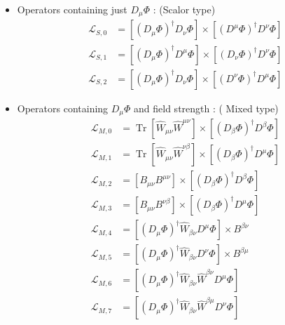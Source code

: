 \begin{itemize}
\item Operators containing just $D_\mu \Phi$ : (Scalor type)
\begin{equation}
\begin{aligned}
\mathcal{L}_{S, 0} &=\left[\left(D_{\mu} \Phi\right)^{\dagger} D_{\nu} \Phi\right] \times\left[\left(D^{\mu} \Phi\right)^{\dagger} D^{\nu} \Phi\right] \\
\mathcal{L}_{S, 1} &=\left[\left(D_{\mu} \Phi\right)^{\dagger} D^{\mu} \Phi\right] \times\left[\left(D_{\nu} \Phi\right)^{\dagger} D^{\nu} \Phi\right] \\
\mathcal{L}_{S, 2} &=\left[\left(D_{\mu} \Phi\right)^{\dagger} D_{\nu} \Phi\right] \times\left[\left(D^{\nu} \Phi\right)^{\dagger} D^{\mu} \Phi\right]
\end{aligned}
\end{equation}
\item Operators containing $D_\mu \Phi$ and field strength : ( Mixed type)
\begin{equation}
\begin{aligned}
\mathcal{L}_{M, 0} &=\operatorname{Tr}\left[\hat{W}_{\mu \nu} \hat{W}^{\mu \nu}\right] \times\left[\left(D_{\beta} \Phi\right)^{\dagger} D^{\beta} \Phi\right] \\
\mathcal{L}_{M, 1} &=\operatorname{Tr}\left[\hat{W}_{\mu \nu} \hat{W}^{\nu \beta}\right] \times\left[\left(D_{\beta} \Phi\right)^{\dagger} D^{\mu} \Phi\right] \\
\mathcal{L}_{M, 2} &=\left[B_{\mu \nu} B^{\mu \nu}\right] \times\left[\left(D_{\beta} \Phi\right)^{\dagger} D^{\beta} \Phi\right] \\
\mathcal{L}_{M, 3} &=\left[B_{\mu \nu} B^{\nu \beta}\right] \times\left[\left(D_{\beta} \Phi\right)^{\dagger} D^{\mu} \Phi\right] \\
\mathcal{L}_{M, 4} &=\left[\left(D_{\mu} \Phi\right)^{\dagger} \hat{W}_{\beta \nu} D^{\mu} \Phi\right] \times B^{\beta \nu} \\
\mathcal{L}_{M, 5} &=\left[\left(D_{\mu} \Phi\right)^{\dagger} \hat{W}_{\beta \nu} D^{\nu} \Phi\right] \times B^{\beta \mu} \\
\mathcal{L}_{M, 6} &=\left[\left(D_{\mu} \Phi\right)^{\dagger} \hat{W}_{\beta \nu} \hat{W}^{\beta \nu} D^{\mu} \Phi\right] \\
\mathcal{L}_{M, 7} &=\left[\left(D_{\mu} \Phi\right)^{\dagger} \hat{W}_{\beta \nu} \hat{W}^{\beta \mu} D^{\nu} \Phi\right]
\end{aligned}
\end{equation}

\end{itemize}
